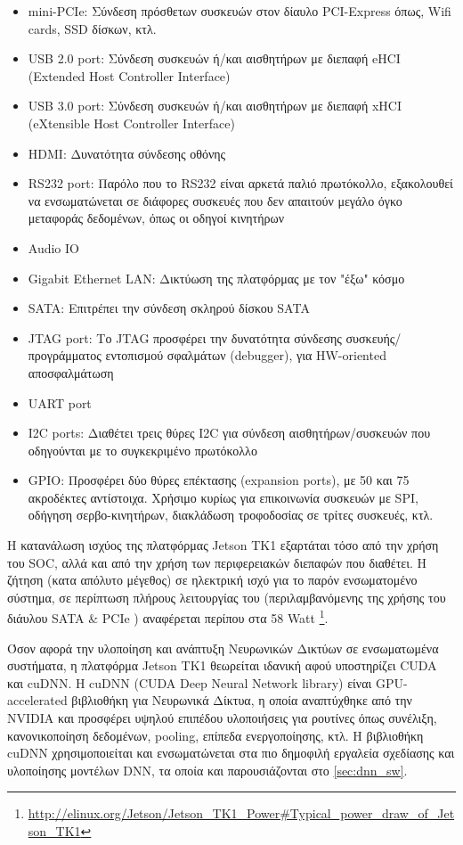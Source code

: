 \begin{itemize}
  \setlength\itemsep{0em}
  \item{mini-PCIe: Σύνδεση πρόσθετων συσκευών στον δίαυλο PCI-Express όπως, Wifi cards, SSD δίσκων, κτλ.}
  \item{USB 2.0 port: Σύνδεση συσκευών ή/και αισθητήρων με διεπαφή eHCI (Extended Host Controller Interface)}
  \item{USB 3.0 port: Σύνδεση συσκευών ή/και αισθητήρων με διεπαφή xHCI (eXtensible Host Controller Interface)}
  \item{HDMI: Δυνατότητα σύνδεσης οθόνης}
  \item{RS232 port: Παρόλο που το RS232 είναι αρκετά παλιό πρωτόκολλο, εξακολουθεί να ενσωματώνεται σε διάφορες συσκευές που δεν απαιτούν μεγάλο όγκο μεταφοράς δεδομένων, όπως οι οδηγοί κινητήρων}
  \item{Audio IO}
  \item{Gigabit Ethernet LAN: Δικτύωση της πλατφόρμας με τον "έξω" κόσμο}
  \item{SATA: Επιτρέπει την σύνδεση σκληρού δίσκου SATA}
  \item{JTAG port: Το JTAG προσφέρει την δυνατότητα σύνδεσης συσκευής/προγράμματος εντοπισμού σφαλμάτων (debugger), για HW-oriented αποσφαλμάτωση}
  \item{UART port}
  \item{I2C ports: Διαθέτει τρεις θύρες I2C για σύνδεση αισθητήρων/συσκευών που οδηγούνται με το συγκεκριμένο πρωτόκολλο}
  \item{GPIO: Προσφέρει δύο θύρες επέκτασης (expansion ports), με 50 και 75 ακροδέκτες αντίστοιχα. Χρήσιμο κυρίως για επικοινωνία συσκευών με SPI, οδήγηση σερβο-κινητήρων, διακλάδωση τροφοδοσίας σε τρίτες συσκευές, κτλ.}
\end{itemize}

Η κατανάλωση ισχύος της πλατφόρμας Jetson TK1 εξαρτάται τόσο από την χρήση
του SOC, αλλά και από την χρήση των περιφερειακών διεπαφών που διαθέτει. Η
ζήτηση (κατα απόλυτο μέγεθος) σε ηλεκτρική ισχύ για το παρόν ενσωματομένο σύστημα,
σε περίπτωση πλήρους λειτουργίας του (περιλαμβανόμενης της χρήσης του διάυλου SATA & PCIe )
αναφέρεται περίπου στα 58 Watt \footnote{\url{http://elinux.org/Jetson/Jetson_TK1_Power#Typical_power_draw_of_Jetson_TK1}}.

Όσον αφορά την υλοποίηση και ανάπτυξη Νευρωνικών Δικτύων σε ενσωματωμένα συστήματα,
η πλατφόρμα Jetson TK1 θεωρείται ιδανική αφού υποστηρίζει CUDA και cuDNN.
H cuDNN (CUDA Deep Neural Network library) είναι GPU-accelerated βιβλιοθήκη για Νευρωνικά Δίκτυα,
η οποία αναπτύχθηκε από την NVIDIA και προσφέρει υψηλού επιπέδου υλοποιήσεις για ρουτίνες όπως συνέλιξη,
κανονικοποίηση δεδομένων, pooling, επίπεδα ενεργοποίησης, κτλ.
Η βιβλιοθήκη cuDNN χρησιμοποιείται και ενσωματώνεται στα πιο δημοφιλή εργαλεία σχεδίασης και υλοποίησης μοντέλων DNN,
τα οποία και παρουσιάζονται στο \autoref{sec:dnn_sw}.

